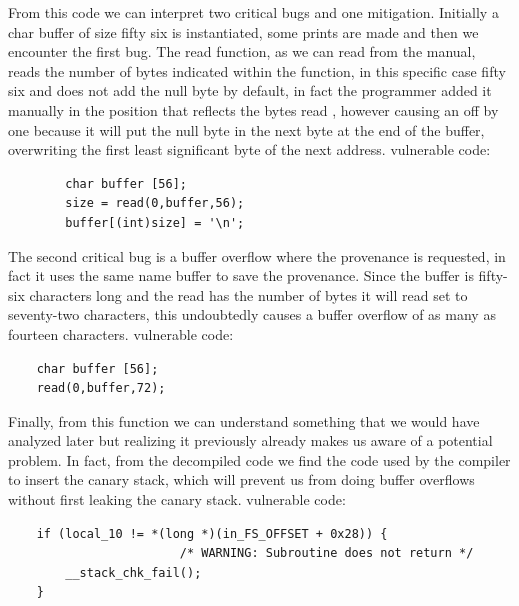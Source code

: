 \documentclass{report}
\begin{document}
    \clearpage
        From this code we can interpret two critical bugs and one mitigation.\newline
    Initially a char buffer of size fifty six is instantiated, some prints are made and then we encounter the first bug.\newline
    The read function, as we can read from the manual, reads the number of bytes indicated within the function, in this specific case fifty six and does not add the null byte by default, in fact the programmer added it manually in the position that reflects the bytes read , however causing an off by one because it will put the null byte in the next byte at the end of the buffer, overwriting the first least significant byte of the next address.\newline
    vulnerable code:\newline
    \begin{verbatim} 
        char buffer [56];
        size = read(0,buffer,56);  
        buffer[(int)size] = '\n';
    \end{verbatim}
    The second critical bug is a buffer overflow where the provenance is requested, in fact it uses the same name buffer to save the provenance.
    Since the buffer is fifty-six characters long and the read has the number of bytes it will read set to seventy-two characters, this undoubtedly causes a buffer overflow of as many as fourteen characters.
    vulnerable code:\newline
    \begin{verbatim} 
    char buffer [56];
    read(0,buffer,72);
    \end{verbatim}
    Finally, from this function we can understand something that we would have analyzed later but realizing it previously already makes us aware of a potential problem.\newline
    In fact, from the decompiled code we find the code used by the compiler to insert the canary stack, which will prevent us from doing buffer overflows without first leaking the canary stack.\newline
    vulnerable code:
    \begin{verbatim} 
    if (local_10 != *(long *)(in_FS_OFFSET + 0x28)) {
                        /* WARNING: Subroutine does not return */
        __stack_chk_fail();
    }
    \end{verbatim}
    
    \clearpage
\end{document}

